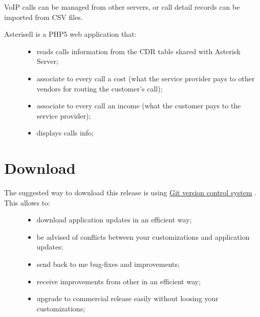\documentclass[letterpaper,10pt,english]{sphinxmanual}
\begin{document}
VoIP calls can be managed from other servers, or call detail records can be imported from CSV files.
\begin{description}
\item[{Asterisell is a PHP5 web application that:}] \leavevmode\begin{itemize}
\item {} 
reads calls information from the CDR table shared with Asterisk Server;

\item {} 
associate to every call a cost (what the service provider pays to other vendors for routing the customer's call);

\item {} 
associate to every call an income (what the customer pays to the service provider);

\item {} 
displays calls info;

\end{itemize}

\end{description}


\section{Download}
\label{index:download}\begin{description}
\item[{The suggested way to download this release is using \href{http://git-scm.com/}{Git version control system} . This allows to:}] \leavevmode\begin{itemize}
\item {} 
download application updates in an efficient way;

\item {} 
be advised of conflicts between your customizations and application updates;

\item {} 
send back to me bug-fixes and improvements;

\item {} 
receive improvements from other in an efficient way;

\item {} 
upgrade to commercial release easily without loosing your customizations;

\end{itemize}

\end{description}
\end{document}
